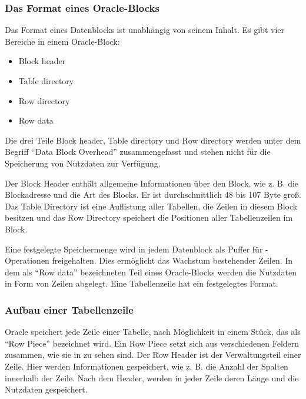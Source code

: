         \subsubsection{Das Format eines Oracle-Blocks}
          Das Format eines Datenblocks ist unabh\"angig von seinem Inhalt. Es gibt vier Bereiche in einem Oracle-Block:
          \begin{itemize}
            \item Block header
            \item Table directory
            \item Row directory
            \item Row data
          \end{itemize}
          Die drei Teile Block header, Table directory und Row directory werden unter dem Begriff \enquote{Data Block Overhead} zusammengefasst und stehen nicht f\"ur die Speicherung von Nutzdaten zur Verf\"ugung.

          Der Block Header enth\"alt allgemeine Informationen \"uber den Block,
          wie z. B. die Blockadresse und die Art des Blocks. Er ist
          durchschnittlich 48 bis 107 Byte gro\ss{}. Das Table Directory ist
          eine Auflistung aller Tabellen, die Zeilen in diesem Block besitzen
          und das Row Directory speichert die Positionen aller Tabellenzeilen im
          Block.

          Eine festgelegte Speichermenge wird in jedem Datenblock als Puffer f\"ur -Operationen freigehalten. Dies erm\"oglicht das Wachstum bestehender Zeilen. In dem als \enquote{Row data} bezeichneten Teil eines Oracle-Blocks werden die Nutzdaten in Form von Zeilen abgelegt. Eine Tabellenzeile hat ein festgelegtes Format.
        \subsubsection{Aufbau einer Tabellenzeile}
          Oracle speichert jede Zeile einer Tabelle, nach M\"oglichkeit in einem St\"uck, das als \enquote{Row Piece} bezeichnet wird. Ein Row Piece setzt sich aus verschiedenen Feldern zusammen, wie sie in  zu sehen sind.
          Der Row Header ist der Verwaltungsteil einer Zeile. Hier werden Informationen gespeichert, wie z. B. die Anzahl der Spalten innerhalb der Zeile. Nach dem Header, werden in jeder Zeile deren L\"ange und die Nutzdaten gespeichert.

